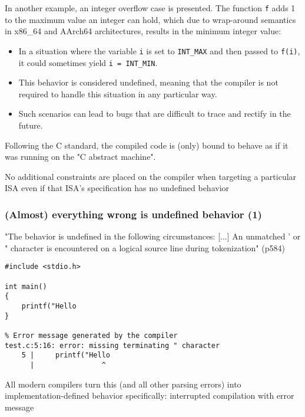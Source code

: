 \documentclass[12pt]{article}
\begin{document}
In another example, an integer overflow case is presented. The function \texttt{f} adds 1 to the maximum value an integer can hold, which due to wrap-around semantics in x86\_64 and AArch64 architectures, results in the minimum integer value:

\begin{itemize}
    \item In a situation where the variable \texttt{i} is set to \texttt{INT\_MAX} and then passed to \texttt{f(i)}, it could sometimes yield \texttt{i = INT\_MIN}.
    \item This behavior is considered undefined, meaning that the compiler is not required to handle this situation in any particular way.
    \item Such scenarios can lead to bugs that are difficult to trace and rectify in the future.
\end{itemize}


Following the C standard, the compiled code is (only) bound to behave as if it was running on the "C abstract machine".

No additional constraints are placed on the compiler when targeting a particular ISA even if that ISA's specification has no undefined behavior

\subsubsection{(Almost) everything wrong is undefined behavior (1)}
"The behavior is undefined in the following circumstances: [...]
An unmatched ' or " character is encountered on a logical source line during tokenization" (p584)

\begin{lstlisting}
#include <stdio.h>

int main()
{
    printf("Hello
}

% Error message generated by the compiler
test.c:5:16: error: missing terminating " character
    5 |     printf("Hello
      |                ^
\end{lstlisting}

All modern compilers turn this (and all other parsing errors) into implementation-defined behavior specifically: interrupted compilation with error message
\end{document}
